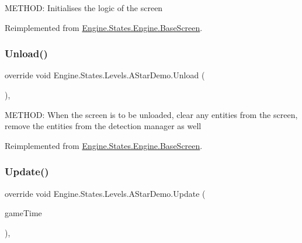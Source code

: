 M\+E\+T\+H\+OD\+: Initialises the logic of the screen 



Reimplemented from \hyperlink{a00550_af8fd6890abf865641e190578ef2e054c}{Engine.\+States.\+Engine.\+Base\+Screen}.

\mbox{\label{a00562_a25e822fbb0f806e84f05a26852c05593}} 
\subsubsection{\texorpdfstring{Unload()}{Unload()}}
{\footnotesize\ttfamily override void Engine.\+States.\+Levels.\+A\+Star\+Demo.\+Unload (\begin{DoxyParamCaption}{ }\end{DoxyParamCaption})\hspace{0.3cm}{\ttfamily [inline]}, {\ttfamily [virtual]}}



M\+E\+T\+H\+OD\+: When the screen is to be unloaded, clear any entities from the screen, remove the entities from the detection manager as well 



Reimplemented from \hyperlink{a00550_a861ab6364e68e3e3b6b9718e34ba18a2}{Engine.\+States.\+Engine.\+Base\+Screen}.

\mbox{\label{a00562_aaa91f362f279bd5d226f49fb150f98e3}} 
\subsubsection{\texorpdfstring{Update()}{Update()}}
{\footnotesize\ttfamily override void Engine.\+States.\+Levels.\+A\+Star\+Demo.\+Update (\begin{DoxyParamCaption}\item[{Game\+Time}]{game\+Time }\end{DoxyParamCaption})\hspace{0.3cm}{\ttfamily [inline]}, {\ttfamily [virtual]}}



